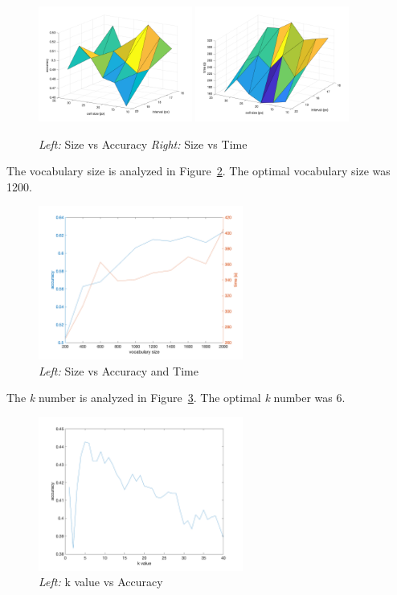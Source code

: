 \begin{figure}[H]
	\centering
	\includegraphics[width=0.45\textwidth]{../code/size_vs_acc.png}
	\includegraphics[width=0.45\textwidth]{../code/size_vs_time.png}
	\caption{\emph{Left:} Size vs Accuracy \emph{Right:} Size vs Time}
	\label{fig:size_adj}
\end{figure}

The vocabulary size is analyzed in Figure~\ref{fig:vocab}. The optimal vocabulary size was 1200. \\


\begin{figure}[H]
	\centering
	\includegraphics[width=0.6\textwidth]{../code/vocab_vs_acc.png}
	\caption{\emph{Left:} Size vs Accuracy and Time}
	\label{fig:vocab}
\end{figure}
The \emph{k} number is analyzed in Figure~\ref{fig:k_num}. The optimal \emph{k} number was 6.
\begin{figure}[H]
	\centering
	\includegraphics[width=0.6\textwidth]{../code/k_vs_acc.png}
	\caption{\emph{Left:} k value vs Accuracy}
	\label{fig:k_num}
\end{figure}


